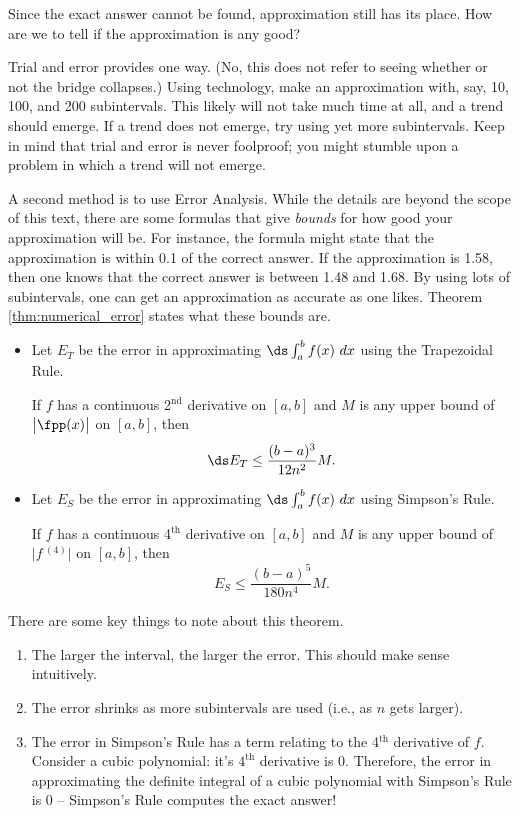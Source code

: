 Since the exact answer cannot be found, approximation still has its place. How are we to tell if the approximation is any good?

Trial and error provides one way. (No, this does not refer to seeing whether or not the bridge collapses.) Using technology, make an approximation with, say, 10, 100, and 200 subintervals. This likely will not take much time at all, and a trend should emerge. If a trend does not emerge, try using yet more subintervals. Keep in mind that trial and error is never foolproof; you might stumble upon a problem in which a trend will not emerge.

A second method is to use Error Analysis. While the details are beyond the scope of this text, there are some formulas that give \textit{bounds} for how good your approximation will be. For instance, the formula might state that the approximation is within 0.1 of the correct answer. If the approximation is 1.58, then one knows that the correct answer is between 1.48 and 1.68. By using lots of subintervals, one can get an approximation as accurate as one likes. Theorem \ref{thm:numerical_error} states what these bounds are.

\setboxwidth{50pt}%
\ifthenelse{\isodd{\thepage}}{}{\hskip -65pt}%
\noindent\begin{minipage}{\specialboxlength}
%
{\begin{itemize}
\item	Let $E_T$ be the error in approximating $\ds \int_a^b f(x)\ dx$ using the Trapezoidal Rule. 

If $f$ has a continuous 2$^\text{nd}$ derivative on $[a,b]$ and $M$ is any upper bound of $\big|\fpp(x)\big|$ on $[a,b]$, then
$$\ds E_T \leq \frac{(b-a)^3}{12n^2}M.$$

\item	Let $E_S$ be the error in approximating $\ds \int_a^b f(x)\ dx$ using Simpson's Rule. 

If $f$ has a continuous 4$^\text{th}$ derivative on $[a,b]$ and $M$ is any upper bound of $\big|f\,^{(4)}\big|$ on $[a,b]$, then
$$E_S \leq \frac{(b-a)^5}{180n^4}M.$$
\end{itemize}
}
\end{minipage}
\restoreboxwidth

There are some key things to note about this theorem.
\begin{enumerate}
	\item		The larger the interval, the larger the error. This should make sense intuitively.
	\item		The error shrinks as more subintervals are used (i.e., as $n$ gets larger).  
	\item		The error in Simpson's Rule has a term relating to the 4$^{\text{th}}$ derivative of $f$. Consider a cubic polynomial: it's $4^{\text{th}}$ derivative is 0. Therefore, the error in approximating the definite integral of a cubic polynomial with Simpson's Rule is 0 -- Simpson's Rule computes the exact answer!
	\end{enumerate}

